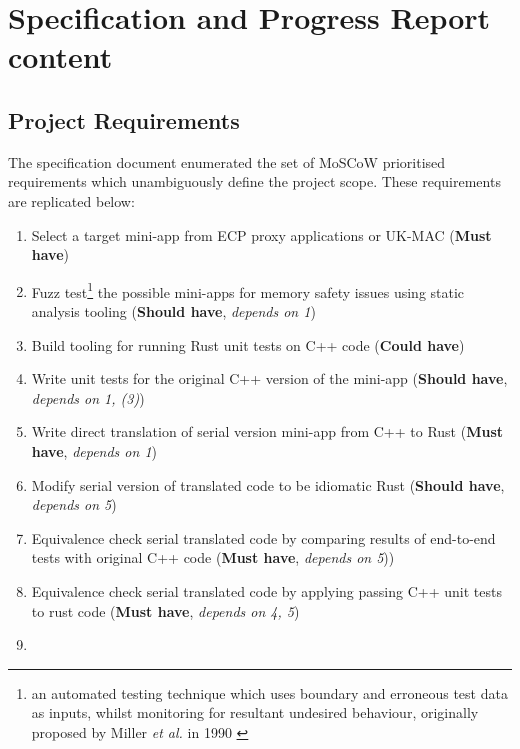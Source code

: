 \appendix

\chapter{Specification and Progress Report content}
\label{ch:specification-progress-report-content}

\section{Project Requirements}
\label{sec:project-requirements}

The specification document enumerated the set of MoSCoW prioritised \cite{CaseMethodFastTrack} requirements which unambiguously define the project scope. These requirements are replicated below:

\begin{enumerate}
\item
  Select a target mini-app from ECP proxy applications or UK-MAC
  (\textbf{Must have})
\item
  Fuzz test\footnote{an automated testing technique which uses boundary and erroneous test data as inputs, whilst monitoring for resultant undesired behaviour, originally proposed by Miller \textit{et al.} in 1990 \cite{millerEmpiricalStudyReliability1990}\cite{liangFuzzingStateArt2018}} the possible mini-apps for memory safety issues using static analysis tooling \cite{stepanovMemorySanitizerFastDetector2015}
  (\textbf{Should have}, \textit{depends on 1})
\item
  Build tooling for running Rust unit tests on C++ code
  (\textbf{Could have})
\item
  Write unit tests for the original C++ version of the
  mini-app
  (\textbf{Should have}, \textit{depends on 1, (3)})
\item
  Write direct translation of serial version mini-app from C++ to Rust
  (\textbf{Must have}, \textit{depends on 1})
\item
  Modify serial version of translated code to be idiomatic Rust \cite{endlerMreIdiomaticrust2023} 
  (\textbf{Should have}, \textit{depends on 5})
\item
  Equivalence check serial translated code by comparing results of end-to-end tests with original C++ code
  (\textbf{Must have}, \textit{depends on 5}))
\item
  Equivalence check serial translated code by applying passing C++ unit tests to rust code
  (\textbf{Must have}, \textit{depends on 4, 5})
\item

\end{enumerate}
